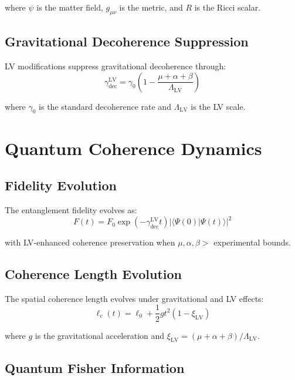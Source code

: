 \documentclass[11pt]{article}
\begin{document}
where $\psi$ is the matter field, $g_{\mu\nu}$ is the metric, and $R$ is the Ricci scalar.

\subsection{Gravitational Decoherence Suppression}

LV modifications suppress gravitational decoherence through:
\begin{equation}
\gamma_{\text{dec}}^{\text{LV}} = \gamma_0 \left(1 - \frac{\mu + \alpha + \beta}{\Lambda_{\text{LV}}}\right)
\end{equation}

where $\gamma_0$ is the standard decoherence rate and $\Lambda_{\text{LV}}$ is the LV scale.

\section{Quantum Coherence Dynamics}

\subsection{Fidelity Evolution}

The entanglement fidelity evolves as:
\begin{equation}
F(t) = F_0 \exp\left(-\gamma_{\text{dec}}^{\text{LV}} t\right) \left|\langle\Psi(0)|\Psi(t)\rangle\right|^2
\end{equation}

with LV-enhanced coherence preservation when $\mu, \alpha, \beta > $ experimental bounds.

\subsection{Coherence Length Evolution}

The spatial coherence length evolves under gravitational and LV effects:
\begin{equation}
\ell_c(t) = \ell_0 + \frac{1}{2}gt^2 \left(1 - \xi_{\text{LV}}\right)
\end{equation}

where $g$ is the gravitational acceleration and $\xi_{\text{LV}} = (\mu + \alpha + \beta)/\Lambda_{\text{LV}}$.

\subsection{Quantum Fisher Information}
\end{document}
